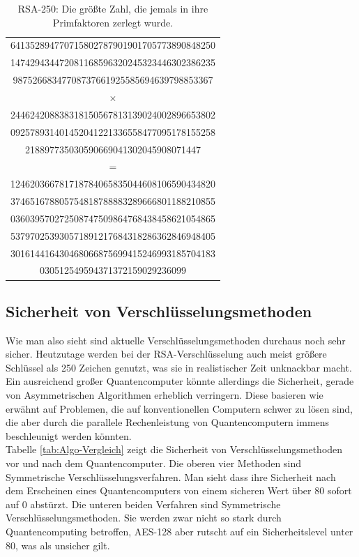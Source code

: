 \documentclass[12pt]{article}
\begin{document}
\begin{table}
    \centering
    \begin{tabular}{c}
    641352894770715802787901901705773890848250\\
    147429434472081168596320245323446302386235\\
    98752668347708737661925585694639798853367\\
    \(\times\)    \\
    244624208838318150567813139024002896653802\\
    092578931401452041221336558477095178155258\\
    218897735030590669041302045908071447\\
    =   \\
    124620366781718784065835044608106590434820\\
    374651678805754818788883289666801188210855\\
    036039570272508747509864768438458621054865\\
    537970253930571891217684318286362846948405\\
    301614416430468066875699415246993185704183\\
    030512549594371372159029236099\\
    \end{tabular}
    \caption{RSA-250: Die größte Zahl, die jemals in ihre Primfaktoren zerlegt wurde.}
    \label{tab:RSA-250}
\end{table}

\subsection{Sicherheit von Verschlüsselungsmethoden}

Wie man also sieht sind aktuelle Verschlüsselungsmethoden durchaus noch sehr sicher. Heutzutage werden bei der RSA-Verschlüsselung auch meist größere Schlüssel als 250 Zeichen genutzt, was sie in realistischer Zeit unknackbar macht. \\

Ein ausreichend großer Quantencomputer könnte allerdings die Sicherheit, gerade von Asymmetrischen Algorithmen erheblich verringern. Diese basieren wie erwähnt auf Problemen, die auf konventionellen Computern schwer zu lösen sind, die aber durch die parallele Rechenleistung von Quantencomputern immens beschleunigt werden könnten. \\

Tabelle \ref{tab:Algo-Vergleich} zeigt die Sicherheit von Verschlüsselungsmethoden vor und nach dem Quantencomputer. Die oberen vier Methoden sind Symmetrische Verschlüsselungsverfahren. Man sieht dass ihre Sicherheit nach dem Erscheinen eines Quantencomputers von einem sicheren Wert über 80 sofort auf 0 abstürzt. Die unteren beiden Verfahren sind Symmetrische Verschlüsselungsmethoden. Sie werden zwar nicht so stark durch Quantencomputing betroffen, AES-128 aber rutscht auf ein Sicherheitslevel unter 80, was als unsicher gilt. \cite{mavroeidis2018impact}
\end{document}
